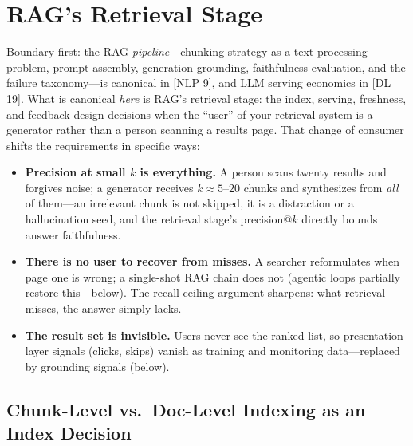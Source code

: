 \section{RAG's Retrieval Stage}
\label{sr:sec:rag_retrieval}

Boundary first: the RAG \textit{pipeline}---chunking strategy as a text-processing problem, prompt assembly, generation grounding, faithfulness evaluation, and the failure taxonomy---is canonical in [NLP 9], and LLM serving economics in [DL 19]. What is canonical \textit{here} is RAG's retrieval stage: the index, serving, freshness, and feedback design decisions when the ``user'' of your retrieval system is a generator rather than a person scanning a results page. That change of consumer shifts the requirements in specific ways:

\begin{itemize}
    \item \textbf{Precision at small $k$ is everything.} A person scans twenty results and forgives noise; a generator receives $k \approx 5$--$20$ chunks and synthesizes from \textit{all} of them---an irrelevant chunk is not skipped, it is a distraction or a hallucination seed, and the retrieval stage's precision@$k$ directly bounds answer faithfulness.
    \item \textbf{There is no user to recover from misses.} A searcher reformulates when page one is wrong; a single-shot RAG chain does not (agentic loops partially restore this---below). The recall ceiling argument sharpens: what retrieval misses, the answer simply lacks.
    \item \textbf{The result set is invisible.} Users never see the ranked list, so presentation-layer signals (clicks, skips) vanish as training and monitoring data---replaced by grounding signals (below).
\end{itemize}

\subsection{Chunk-Level vs.\ Doc-Level Indexing as an Index Decision}

